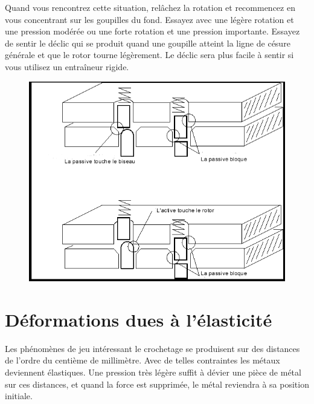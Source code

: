 \documentclass[a4paper,french,11pt,twoside]{report}
\begin{document}
Quand vous rencontrez cette situation, relâchez la rotation et recommencez en vous concentrant sur les goupilles du fond. Essayez avec une légère rotation et une pression modérée ou une forte rotation et une pression importante. Essayez de sentir le déclic qui se produit quand une goupille atteint la ligne de césure générale et que le rotor tourne légèrement. Le déclic sera plus facile à sentir si vous utilisez un entraîneur rigide.


\begin{figure}[h] \begin{center}
        \includegraphics[scale=0.6]{images/Image20}
        \caption{}
\end{center} \end{figure}


\section{Déformations dues à l'élasticité}

Les phénomènes de jeu intéressant le crochetage se produisent sur des distances de l'ordre du centième de millimètre. Avec de telles contraintes les métaux deviennent élastiques. Une pression très légère suffit à dévier une pièce de métal sur ces distances, et quand la force est supprimée, le métal reviendra à sa position initiale.
\end{document}
